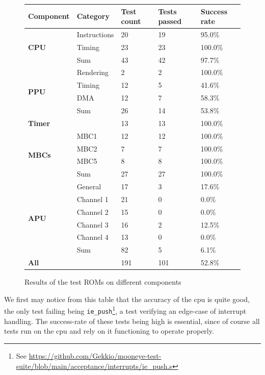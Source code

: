\documentclass[11pt]{informatics-report}
\newcommand{\ftnt}[1]{\footnote{See \url{#1}}}
\begin{document}
\begin{figure}[h]
    \centering
    \begin{tabular}{|l|l|l|l|l|}
    \hline
    \textbf{Component} & \textbf{Category} & \textbf{Test count} & \textbf{Tests passed} & \textbf{Success rate} \\ \hline
	\multirow{3}{*}{\textbf{CPU}}
    & Instructions & 20 & 19 &  95.0\% \\
    &       Timing & 23 & 23 & 100.0\% \\\cline{2-5}
    &          Sum & 43 & 42 &  97.7\% \\\hline
	\multirow{4}{*}{\textbf{PPU}}
    &    Rendering &  2 &  2 & 100.0\% \\
    &       Timing & 12 &  5 &  41.6\% \\
    &          DMA & 12 &  7 &  58.3\% \\\cline{2-5}
    &          Sum & 26 & 14 &  53.8\% \\\hline
    \multicolumn{2}{|l|}{\textbf{Timer}} & 13 & 13 & 100.0\% \\\hline
   	\multirow{4}{*}{\textbf{MBCs}}
    &         MBC1 & 12 & 12 & 100.0\% \\
    &         MBC2 &  7 &  7 & 100.0\% \\
    &         MBC5 &  8 &  8 & 100.0\% \\\cline{2-5}
    &          Sum & 27 & 27 & 100.0\% \\\hline
   	\multirow{6}{*}{\textbf{APU}}
    &      General & 17 &  3 &  17.6\% \\
    &    Channel 1 & 21 &  0 &   0.0\% \\
    &    Channel 2 & 15 &  0 &   0.0\% \\
    &    Channel 3 & 16 &  2 &  12.5\% \\
    &    Channel 4 & 13 &  0 &   0.0\% \\\cline{2-5}
    &          Sum & 82 &  5 &   6.1\% \\\hline
    \multicolumn{2}{|l|}{\textbf{All}} & 191 & 101 & 52.8\% \\\hline
    \end{tabular}
    \caption{Results of the test ROMs on different components}
    \label{fig:stats-tests-absolute}
\end{figure}

We first may notice from this table that the accuracy of the \gls{cpu} is quite good, the only test failing being \texttt{ie\_push}\ftnt{https://github.com/Gekkio/mooneye-test-suite/blob/main/acceptance/interrupts/ie\_push.s}, a test verifying an edge-case of interrupt handling. The success-rate of these tests being high is essential, since of course all tests run on the \gls{cpu} and rely on it functioning to operate properly.
\end{document}
